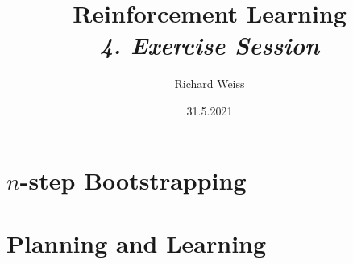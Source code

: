 \documentclass{article}
\title
{
    Reinforcement Learning \\
    \vspace{4pt}
    \normalsize
    \textit{4. Exercise Session}
}
\author{Richard Weiss}
\date{31.5.2021}
\numberwithin{figure}{section}
\begin{document}
\maketitle

\setcounter{section}{6}
\section{$n$-step Bootstrapping}




\setcounter{section}{7}
\section{Planning and Learning}




\printbibliography
\end{document}
